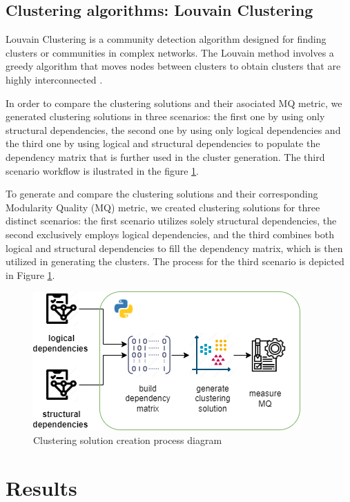 \documentclass[conference]{IEEEtran}
\begin{document}
\subsection{Clustering algorithms: Louvain Clustering}
Louvain Clustering is a community detection algorithm designed for finding clusters or communities in complex networks. The Louvain method involves a greedy algorithm that moves nodes between clusters to obtain clusters that are highly interconnected \cite{louvain_clustering}.

In order to compare the clustering solutions and their asociated MQ metric, we generated clustering solutions in three scenarios: the first one by using only structural dependencies, the second one by using only logical dependencies and the third one by using logical and structural dependencies to populate the dependency matrix that is further used in the cluster generation. The third scenario workflow is ilustrated in the figure \ref{fig:clustering-gen}.

To generate and compare the clustering solutions and their corresponding Modularity Quality (MQ) metric, we created clustering solutions for three distinct scenarios: the first scenario utilizes solely structural dependencies, the second exclusively employs logical dependencies, and the third combines both logical and structural dependencies to fill the dependency matrix, which is then utilized in generating the clusters. The process for the third scenario is depicted in Figure \ref{fig:clustering-gen}.

\begin{figure}
\centering
\includegraphics[width=\columnwidth]{clustering-generation.png}
\caption{Clustering solution creation process diagram}
\label{fig:clustering-gen}
\centering
\end{figure}


\section{Results}
\label{results}
\end{document}
